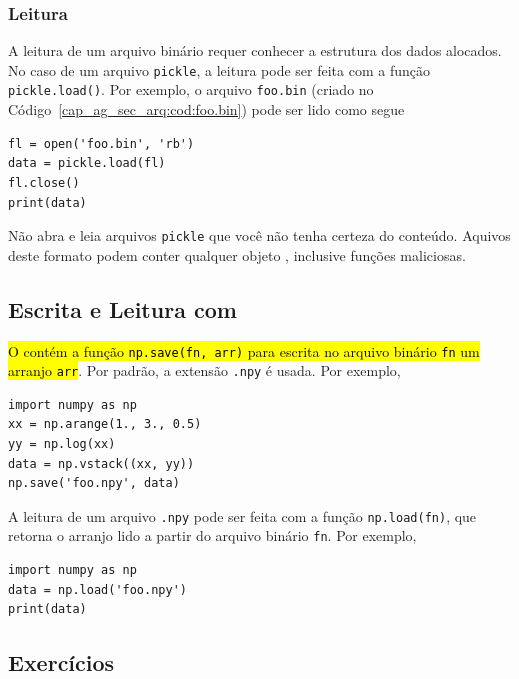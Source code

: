 \subsubsection{Leitura}

A leitura de um arquivo binário requer conhecer a estrutura dos dados alocados. No caso de um arquivo \lstinline+pickle+, a leitura pode ser feita com a função \lstinline+pickle.load()+. Por exemplo, o arquivo \lstinline+foo.bin+ (criado no Código~\ref{cap_ag_sec_arq:cod:foo.bin}) pode ser lido como segue

\begin{lstlisting}
fl = open('foo.bin', 'rb')
data = pickle.load(fl)
fl.close()
print(data)
\end{lstlisting}

\begin{obs}
  Não abra e leia arquivos \lstinline+pickle+ que você não tenha certeza do conteúdo. Aquivos deste formato podem conter qualquer objeto {\python}, inclusive funções maliciosas.
\end{obs}

\subsection{Escrita e Leitura com {\numpy}}

\hl{O {\numpy} contém a função {\lstinline+np.save(fn, arr)+} para escrita no arquivo binário {\lstinline+fn+} um arranjo {\lstinline+arr+}}. Por padrão, a extensão \lstinline+.npy+ é usada. Por exemplo,


\begin{lstlisting}
import numpy as np
xx = np.arange(1., 3., 0.5)
yy = np.log(xx)
data = np.vstack((xx, yy))
np.save('foo.npy', data)
\end{lstlisting}

A leitura de um arquivo \lstinline+.npy+ pode ser feita com a função \lstinline+np.load(fn)+, que retorna o arranjo lido a partir do arquivo binário \lstinline+fn+. Por exemplo,

\begin{lstlisting}
import numpy as np
data = np.load('foo.npy')
print(data)
\end{lstlisting}

\subsection{Exercícios}

